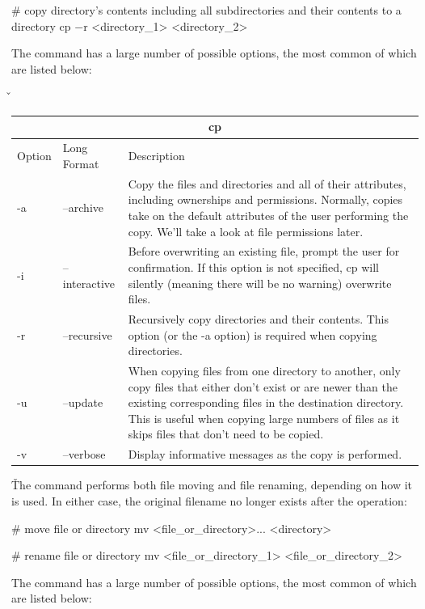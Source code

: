 \begin{bash}
# copy directory's contents including all subdirectories and their contents to a directory
cp $-$r <directory_1> <directory_2>
\end{bash}

The  command has a large number of possible options, the most common of which are listed below:

\v

\begin{tabular}{ |p{1cm}|p{3cm}||p{10.6cm}| }
\hline
\multicolumn{3}{|c|}{cp} \\
\hline
Option& Long Format& Description\\
\hline
-a & --archive & Copy the files and directories and all of their attributes, including ownerships and permissions. Normally, copies take on the default attributes of the user performing the copy. We'll take a look at file permissions later.\\
-i & --interactive & Before overwriting an existing file, prompt the user for confirmation. If this option is not specified, cp will silently (meaning there will be no warning) overwrite files.\\
-r & --recursive & Recursively copy directories and their contents. This option (or the -a option) is required when copying directories.\\
-u & --update & When copying files from one directory to another, only copy files that either don't exist or are newer than the existing corresponding files in the destination directory. This is useful when copying large numbers of files as it skips files that don't need to be copied.\\
-v & --verbose & Display informative messages as the copy is performed.\\
\hline
\end{tabular}

\v

The  command performs both file moving and file renaming, depending on how it is used. In either case,
the original filename no longer exists after the operation:
\begin{bash}
# move file or directory
mv <file_or_directory>... <directory>
\end{bash}

\begin{bash}
# rename file or directory
mv <file_or_directory_1> <file_or_directory_2>
\end{bash}

The  command has a large number of possible options, the most common of which are listed below:

